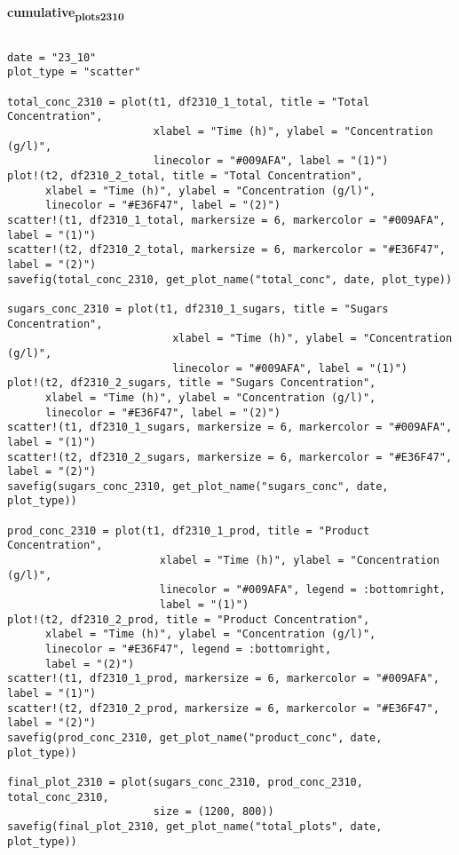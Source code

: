 \documentclass[11pt]{article}
\begin{document}
\textbf{cumulative\textsubscript{plots}\textsubscript{23}\textsubscript{10}}
\begin{verbatim}

date = "23_10"
plot_type = "scatter"

total_conc_2310 = plot(t1, df2310_1_total, title = "Total Concentration",
                       xlabel = "Time (h)", ylabel = "Concentration (g/l)",
                       linecolor = "#009AFA", label = "(1)")
plot!(t2, df2310_2_total, title = "Total Concentration",
      xlabel = "Time (h)", ylabel = "Concentration (g/l)",
      linecolor = "#E36F47", label = "(2)")
scatter!(t1, df2310_1_total, markersize = 6, markercolor = "#009AFA", label = "(1)")
scatter!(t2, df2310_2_total, markersize = 6, markercolor = "#E36F47", label = "(2)")
savefig(total_conc_2310, get_plot_name("total_conc", date, plot_type))

sugars_conc_2310 = plot(t1, df2310_1_sugars, title = "Sugars Concentration",
                          xlabel = "Time (h)", ylabel = "Concentration (g/l)",
                          linecolor = "#009AFA", label = "(1)")
plot!(t2, df2310_2_sugars, title = "Sugars Concentration",
      xlabel = "Time (h)", ylabel = "Concentration (g/l)",
      linecolor = "#E36F47", label = "(2)")
scatter!(t1, df2310_1_sugars, markersize = 6, markercolor = "#009AFA", label = "(1)")
scatter!(t2, df2310_2_sugars, markersize = 6, markercolor = "#E36F47", label = "(2)")
savefig(sugars_conc_2310, get_plot_name("sugars_conc", date, plot_type))

prod_conc_2310 = plot(t1, df2310_1_prod, title = "Product Concentration",
                        xlabel = "Time (h)", ylabel = "Concentration (g/l)",
                        linecolor = "#009AFA", legend = :bottomright,
                        label = "(1)")
plot!(t2, df2310_2_prod, title = "Product Concentration",
      xlabel = "Time (h)", ylabel = "Concentration (g/l)",
      linecolor = "#E36F47", legend = :bottomright,
      label = "(2)")
scatter!(t1, df2310_1_prod, markersize = 6, markercolor = "#009AFA", label = "(1)")
scatter!(t2, df2310_2_prod, markersize = 6, markercolor = "#E36F47", label = "(2)")
savefig(prod_conc_2310, get_plot_name("product_conc", date, plot_type))

final_plot_2310 = plot(sugars_conc_2310, prod_conc_2310, total_conc_2310,
                       size = (1200, 800))
savefig(final_plot_2310, get_plot_name("total_plots", date, plot_type))

\end{verbatim}
\end{document}
